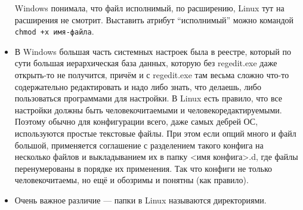 \documentclass{../../text-style}
\begin{document}
\begin{itemize}
        Windows понимала, что файл исполнимый, по расширению, Linux тут на расширения не смотрит.
        Выставить атрибут \enquote{исполнимый} можно командой \texttt{chmod +x имя-файла}.
    \item В Windows большая часть системных настроек была в реестре, который по сути большая иерархическая база данных, которую без regedit.exe даже открыть-то не получится, причём и с regedit.exe там весьма сложно что-то содержательно редактировать и надо либо знать, что делаешь, либо пользоваться программами для настройки.
        В Linux есть правило, что все настройки должны быть человекочитаемыми и человекоредактируемыми.
        Поэтому обычно для конфигурации всего, даже самых дебрей ОС, используются простые текстовые файлы.
        При этом если опций много и файл большой, применяется соглашение с разделением такого конфига на несколько файлов и выкладыванием их в папку <имя конфига>.d, где файлы перенумерованы в порядке их применения.
        Так что конфиги не только человекочитаемы, но ещё и обозримы и понятны (как правило).
    \item Очень важное различие --- папки в Linux называются директориями.
\end{itemize}
\end{document}
